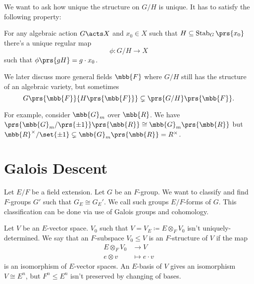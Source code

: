 \documentclass[10pt,a4paper,twoside,openany,hidelinks]{book}
\DeclareMathOperator{\Stab}{Stab}
\begin{document}
\begin{remark}
We want to ask how unique the structure on $G/H$ is unique.
It has to satisfy the following property:

For any algebraic action $G \acts X$ and $x_0 \in X$ such that $H \subseteq \Stab_G\prs{x_0}$ there's a unique regular map
\[\phi \colon G/H \to X\]
such that $\phi\prs{gH} = g \cdot x_0$.
\end{remark}

\begin{remark}
We later discuss more general fields $\mbb{F}$ where $G/H$ still has the structure of an algebraic variety, but sometimes
\[G\prs{\mbb{F}}{H\prs{\mbb{F}}} \subsetneq \prs{G/H}\prs{\mbb{F}} \text{.}\]

For example, consider $\mbb{G}_m$ over $\mbb{R}$. We have $\prs{\mbb{G}_m/\prs{\pm 1}}\prs{\mbb{R}} \cong \mbb{G}_m\prs{\mbb{R}}$ but $\mbb{R}^\times / \set{\pm 1} \subsetneq \mbb{G}_m\prs{\mbb{R}} = R^\times$.
\end{remark}

\section{Galois Descent}

Let $E/F$ be a field extension. Let $G$ be an $F$-group. We want to classify and find $F$-groups $G'$ such that $G_E \cong G_E'$. We call such groups $E/F$-forms of $G$.
This classification can be done via use of Galois groups and cohomology.

Let $V$ be an $E$-vector space. $V_0$ such that $V = V_E \coloneqq E \otimes_F V_0$ isn't uniquely-determined. We say that an $F$-subspace $V_0 \leq V$ is an $F$-structure of $V$ if the map
\begin{align*}
E \otimes_F V_0 &\to V \\
e \otimes v &\mapsto e \cdot v
\end{align*}
is an isomorphism of $E$-vector spaces.
An $E$-basis of $V$ gives an isomorphism $V \cong E^n$, but $F^n \leq E^n$ isn't preserved by changing of bases.

\backmatter
\end{document}
